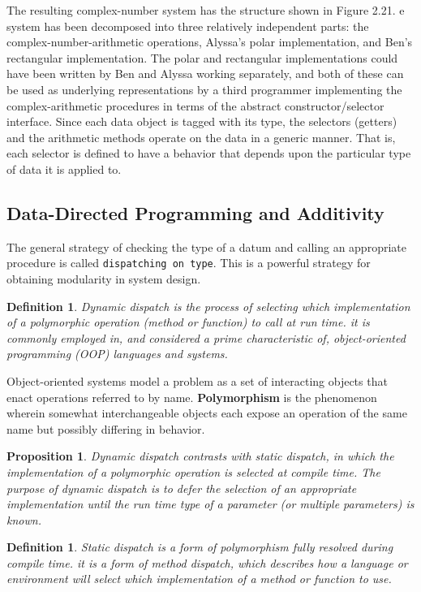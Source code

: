 \documentclass[a4paper,twoside]{article}
\newtheorem{proposition}[theorem]{Proposition}
\newtheorem{definition}[theorem]{Definition}
\numberwithin{equation}{section}
\begin{document}
The resulting complex-number system has the structure shown in Figure 2.21. e system has been
decomposed into three relatively independent parts: the complex-number-arithmetic operations,
Alyssa's polar implementation, and Ben's rectangular implementation. The polar and rectangular
implementations could have been written by Ben and Alyssa working separately, and both of these
can be used as underlying representations by a third programmer implementing the complex-arithmetic
procedures in terms of the abstract constructor/selector interface. Since each data object is tagged
with its type, the selectors (getters) and the arithmetic methods operate on the data in a generic
manner. That is, each selector is defined to have a behavior that depends upon the particular
type of data it is applied to.
\subsection{Data-Directed Programming and Additivity}
The general strategy of checking the type of a datum and calling an
appropriate procedure is called \texttt{dispatching on type}. This is a powerful strategy for
obtaining modularity in system design.
\begin{definition}
    Dynamic dispatch is the process of selecting which implementation of a polymorphic operation
    (method or function) to call at run time. it is commonly employed in, and considered a prime
    characteristic of, object-oriented programming (OOP) languages and systems.
\end{definition}
Object-oriented systems model a problem as a set of interacting objects that enact operations
referred to by name. \textbf{Polymorphism} is the phenomenon wherein somewhat interchangeable objects
each expose an operation of the same name but possibly differing in behavior.
\begin{proposition}
    Dynamic dispatch contrasts with static dispatch, in which the implementation of a polymorphic
    operation is selected at compile time. The purpose of dynamic dispatch is to defer
    the selection of an appropriate implementation until the run time type of a parameter
    (or multiple parameters) is known.
\end{proposition}
\begin{definition}
    Static dispatch is a form of polymorphism fully resolved during compile time. it is a form of
    method dispatch, which describes how a language or environment will select which implementation
    of a method or function to use.
\end{definition}
\end{document}
